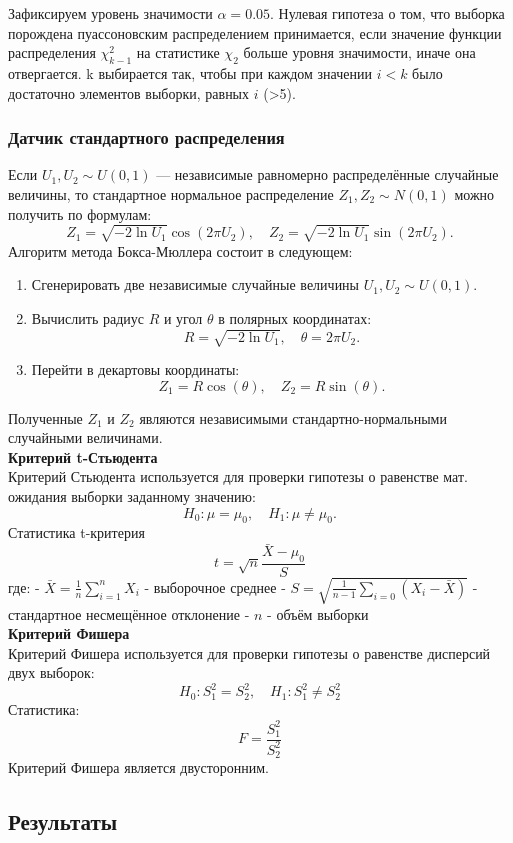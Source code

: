 \documentclass[11pt]{article}
\begin{document}
Зафиксируем уровень значимости $\alpha = 0.05$. Нулевая гипотеза о том, что выборка порождена пуассоновским распределением принимается, если значение функции распределения $\chi^2_{k-1}$ на статистике $\chi_2$ больше уровня значимости, иначе она отвергается. k выбирается так, чтобы при каждом значении $i < k$ было достаточно элементов выборки, равных $i$ (>5).
\subsubsection{Датчик стандартного распределения}
Если $U_1, U_2 \sim U(0,1)$ --- независимые равномерно распределённые случайные величины, то стандартное нормальное распределение $Z_1, Z_2 \sim N(0,1)$ можно получить по формулам:
\[
Z_1 = \sqrt{-2 \ln U_1} \cos(2\pi U_2), \quad Z_2 = \sqrt{-2 \ln U_1} \sin(2\pi U_2).
\]
Алгоритм метода Бокса-Мюллера состоит в следующем:

\begin{enumerate}
    \item Сгенерировать две независимые случайные величины $U_1, U_2 \sim U(0,1)$.
    \item Вычислить радиус $R$ и угол $\theta$ в полярных координатах:
    \[
    R = \sqrt{-2 \ln U_1}, \quad \theta = 2\pi U_2.
    \]
    \item Перейти в декартовы координаты:
    \[
    Z_1 = R \cos(\theta), \quad Z_2 = R \sin(\theta).
    \]
\end{enumerate}

Полученные $Z_1$ и $Z_2$ являются независимыми стандартно-нормальными случайными величинами.\\
\textbf{Критерий t-Стьюдента}\\
Критерий Стьюдента используется для проверки гипотезы о равенстве мат. ожидания выборки заданному значению:
$$
H_0: \mu = \mu_0, \quad H_1: \mu \neq \mu_0.
$$
Статистика t-критерия
$$
t = \sqrt n \frac{\bar{X} - \mu_0}{S}
$$
где:
- $\bar{X} = \frac{1}{n} \sum_{i=1}^n X_i$ - выборочное среднее
- $S = \sqrt {\frac{1}{n-1} \sum_{i = 0}(X_i - \bar{X})}$ - стандартное несмещённое отклонение
- $n$ - объём выборки\\

\textbf{Критерий Фишера}\\
Критерий Фишера используется для проверки гипотезы о равенстве
дисперсий двух выборок:
$$
H_0:S_1^2 = S_2^2, \quad H_1:S_1^2 \neq S_2^2
$$
Статистика:
$$
F = \frac{S_1^2}{S_2^2}
$$
Критерий Фишера является двусторонним.
\subsection{Результаты}
\end{document}
